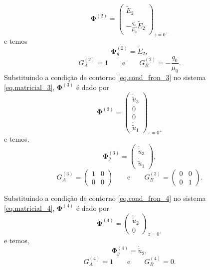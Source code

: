 \begin{equation*}
\mathbf{\Phi}^{(2)}=
\begin{pmatrix}
\tilde{E}_2\\\\
-\frac{q_0}{\mu_0}\tilde{E}_2
\end{pmatrix}_{z=0^+}
\end{equation*}
e temos
\begin{equation*}
\mathbf{\Phi}_g^{(2)}=\tilde{E}_2,
\end{equation*}
\begin{equation*}
G_A^{(2)}=1\qquad\text{e}\qquad G_B^{(2)}=-\frac{q_0}{\mu_0}.
\end{equation*}
Substituindo a condi\c{c}\~ao de contorno \ref{eq.cond_fron_3} no sistema \ref{eq.matricial_3}, $\mathbf{\Phi}^{(3)}$ \'e dado por
\begin{equation*}
\mathbf{\Phi}^{(3)}=
\begin{pmatrix}
\dot{\tilde{u}}_3\\
0\\
0\\
\dot{\tilde{u}}_1
\end{pmatrix}_{z=0^+}
\end{equation*}
e temos,
\begin{equation*}
\mathbf{\Phi}_g^{(3)}=
\begin{pmatrix}
\dot{\tilde{u}}_3\\
\dot{\tilde{u}}_1
\end{pmatrix},
\end{equation*}
\begin{equation*}
G_A^{(3)}=
\begin{pmatrix}
1&0\\
0&0
\end{pmatrix}
\qquad\text{e}\qquad G_B^{(3)}=
\begin{pmatrix}
0&0\\
0&1
\end{pmatrix}.
\end{equation*}

Substituindo a condi\c{c}\~ao de contorno \ref{eq.cond_fron_4} no sistema \ref{eq.matricial_4}, $\mathbf{\Phi}^{(4)}$ \'e dado por
\begin{equation*}
\mathbf{\Phi}^{(4)}=
\begin{pmatrix}
\dot{\tilde{u}}_2\\
0
\end{pmatrix}_{z=0^+}
\end{equation*}
e temos,
\begin{equation*}
\mathbf{\Phi}_g^{(4)}=\dot{\tilde{u}}_2,
\end{equation*}
\begin{equation*}
G_A^{(4)}=1\qquad\text{e}\qquad G_B^{(4)}=0.
\end{equation*}

